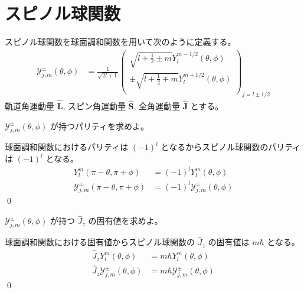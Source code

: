 \documentclass[uplatex,dvipdfmx,a4paper,11pt]{jlreq}
\makeatletter
\theoremstyle{definition}
\renewenvironment{proof}[1][\proofname]{\par
  \normalfont
  \topsep6\p@\@plus6\p@ \trivlist
  \item[\hskip\labelsep{\bfseries #1}\@addpunct{\bfseries}]\ignorespaces\quad\par
}{%
  \qed\endtrivlist\@endpefalse
}
\renewcommand\proofname{証明}
\numberwithin{equation}{section}
\makeatother
\begin{document}
\section{スピノル球関数}
\begin{problem}
スピノル球関数を球面調和関数を用いて次のように定義する。
\begin{align}
  \mathcal{Y}_{j, m}^\pm(\theta, \phi) & = \frac{1}{\sqrt{2l + 1}}\begin{pmatrix}
                                                                    \sqrt{l + \frac{1}{2} \pm m}Y_l^{m - 1/2}(\theta, \phi)    \\
                                                                    \pm\sqrt{l + \frac{1}{2} \mp m}Y_l^{m + 1/2}(\theta, \phi) \\
                                                                  \end{pmatrix}_{j = l\pm 1/2}
\end{align}
軌道角運動量 $\hat{\bm{L}}$, スピン角運動量 $\hat{\bm{S}}$, 全角運動量 $\hat{\bm{J}}$ とする。

$\mathcal{Y}_{j, m}^\pm(\theta, \phi)$ が持つパリティを求めよ。
\end{problem}
\begin{proof}
  球面調和関数におけるパリティは $(-1)^l$ となるからスピノル球関数のパリティは $(-1)^l$ となる。
  \begin{align}
    Y_l^m(\pi - \theta, \pi + \phi)                  & = (-1)^lY_l^m(\theta, \phi)                  \\
    \mathcal{Y}_{j, m}^\pm(\pi - \theta, \pi + \phi) & = (-1)^l\mathcal{Y}_{j, m}^\pm(\theta, \phi)
  \end{align}
\end{proof}

\begin{problem}
$\mathcal{Y}_{j, m}^\pm(\theta, \phi)$ が持つ $\hat{J}_z$ の固有値を求めよ。
\end{problem}
\begin{proof}
  球面調和関数における固有値からスピノル球関数の $\hat{J}_z$ の固有値は $m\hbar$ となる。
  \begin{align}
    \hat{J}_zY_l^m(\theta, \phi)                  & = m\hbar Y_l^m(\theta, \phi)                  \\
    \hat{J}_z\mathcal{Y}_{j, m}^\pm(\theta, \phi) & = m\hbar \mathcal{Y}_{j, m}^\pm(\theta, \phi)
  \end{align}
\end{proof}
\end{document}
